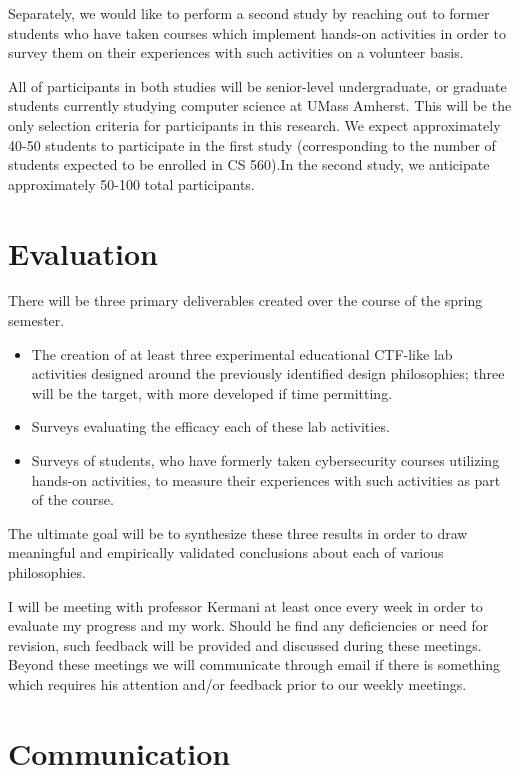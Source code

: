 \documentclass{article}
\begin{document}
    Separately, we would like to perform a second study by reaching out to former students who have taken courses which implement hands-on activities in order to survey them on their experiences with such activities on a volunteer basis. 

    All of participants in both studies will be senior-level undergraduate, or graduate students currently studying computer science at UMass Amherst. %
This will be the only selection criteria for participants in this research. %
We expect approximately 40-50 students to participate in the first study (corresponding to the number of students expected to be enrolled in CS 560).In the second study, we anticipate approximately 50-100 total participants. 

\section{Evaluation}

    There will be three primary deliverables created over the course of the spring semester.

    \begin{itemize}
        \item The creation of at least three experimental educational CTF-like lab activities designed around the previously identified design philosophies; %
three will be the target, with more developed if time permitting.
        \item Surveys evaluating the efficacy each of these lab activities.
        \item Surveys of students, who have formerly taken cybersecurity courses utilizing hands-on activities, to measure their experiences with such activities as part of the course. 
    \end{itemize}

    The ultimate goal will be to synthesize these three results in order to draw meaningful and empirically validated conclusions about each of various philosophies.
    
        I will be meeting with professor Kermani at least once every week in order to evaluate my progress and my work. %
Should he find any deficiencies or need for revision, such feedback will be provided and discussed during these meetings. %
Beyond these meetings we will communicate through email if there is something which requires his attention and/or feedback prior to our weekly meetings. 

\section{Communication}
\end{document}
